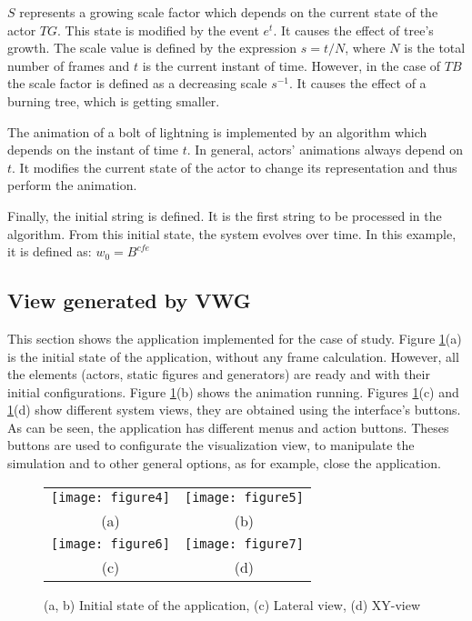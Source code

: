 \documentclass[10pt,journal,letterpaper,compsoc]{IEEEtran}
\begin{document}
$S$ represents a growing scale factor which depends on the current state of the actor $TG$. This state is modified by the event $e^{t}$. It causes the effect of tree's growth. The scale value is defined by the expression $s = t / N$, where $N$ is the total number of frames and $t$ is the current instant of time. However, in the case of $TB$ the scale factor is defined as a decreasing scale $s^{-1}$. It causes the effect of a burning tree, which is getting smaller.

The animation of a bolt of lightning is implemented by an algorithm which depends on the instant of time $t$. In general, actors' animations always depend on $t$. It modifies the current state of the actor to change its representation and thus perform the animation.

Finally, the initial string is defined. It is the first string to be processed in the algorithm. From this initial state, the system evolves over time. In this example, it is defined as: $w_{0}=B^{cfe}$





\subsection{View generated by VWG
\label{sec:view_generated}}



This section shows the application implemented for the case of study. Figure \ref{fig:programView}(a) is the initial state of the application, without any frame calculation. However, all the elements (actors, static figures and generators) are ready and with their initial configurations. Figure \ref{fig:programView}(b) shows the animation running. Figures \ref{fig:programView}(c) and \ref{fig:programView}(d) show different system views, they are obtained using the interface's buttons. As can be seen, the application has different menus and action buttons. Theses buttons are used to configurate the visualization view, to manipulate the simulation and to other general options, as for example, close the application.


\begin{figure}[htb]
    \begin{tabular}{cc}
        \texttt{[image: figure4]} &
        \texttt{[image: figure5]} \\
        \small{(a)} & \small{(b)} \\
        \texttt{[image: figure6]} &
        \texttt{[image: figure7]} \\
        \small{(c)} & \small{(d)} \\
    \end{tabular}
    \caption{\label{fig:programView}
    (a, b) Initial state of the application, (c) Lateral view, (d) XY-view}
\end{figure}
\end{document}
